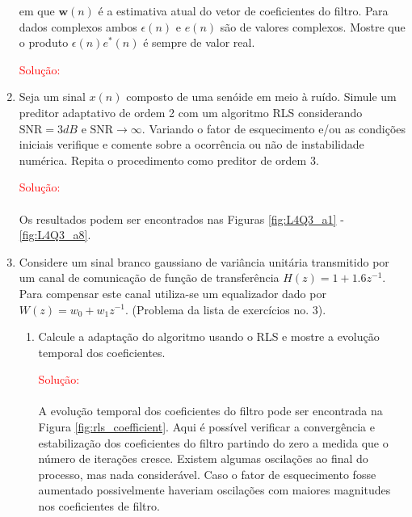 \documentclass[a4paper,10pt]{article}
\begin{document}
\begin{enumerate}
				em que $\boldsymbol{w}(n)$ é a estimativa atual do vetor de coeficientes do filtro. Para dados complexos ambos
				$\epsilon(n)$ e $e(n)$ são de valores complexos. Mostre que o produto $\epsilon(n)e^{*}(n)$ é sempre de valor real.

				\textcolor{red}{Solução:}

			\item Seja um sinal $x(n)$ composto de uma senóide em meio à ruído. Simule um preditor adaptativo
			de ordem 2 com um algoritmo RLS considerando $\text{SNR} = 3 dB$ e $\text{SNR} \rightarrow \infty$. Variando o fator
			de esquecimento e/ou as condições iniciais verifique e comente sobre a ocorrência ou não de
			instabilidade numérica. Repita o procedimento como preditor de ordem 3.

				\textcolor{red}{Solução:}

				\paragraph{}Os resultados podem ser encontrados nas Figuras \ref{fig:L4Q3_a1} - \ref{fig:L4Q3_a8}.

			\item Considere um sinal branco gaussiano de variância unitária transmitido por um canal de comunicação
			de função de transferência $H(z) = 1 + 1.6z^{-1}$. Para compensar este canal utiliza-se um equalizador
			dado por $W(z) = w_{0} + w_{1} z^{-1}$. (Problema da lista de exercícios no. 3).
	
				\begin{enumerate}
					
					\item Calcule a adaptação do algoritmo usando o RLS e mostre a evolução temporal dos coeficientes.
				
						\textcolor{red}{Solução:}

						\paragraph{}A evolução temporal dos coeficientes do filtro pode ser encontrada na Figura \ref{fig:rls_coefficient}.  
						Aqui é possível verificar a convergência e estabilização dos coeficientes do filtro partindo do zero a medida que o número 
						de iterações cresce. Existem algumas oscilações ao final do processo, mas nada considerável. Caso o fator de esquecimento fosse
						aumentado possivelmente haveriam oscilações com maiores magnitudes nos coeficientes de filtro. 


\end{enumerate}
\end{enumerate}
\end{document}
